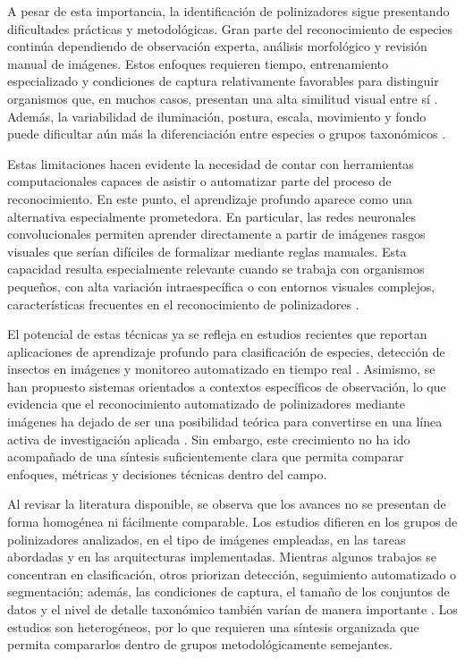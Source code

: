 A pesar de esta importancia, la identificación de polinizadores sigue presentando dificultades prácticas y metodológicas. Gran parte del reconocimiento de especies continúa dependiendo de observación experta, análisis morfológico y revisión manual de imágenes. Estos enfoques requieren tiempo, entrenamiento especializado y condiciones de captura relativamente favorables para distinguir organismos que, en muchos casos, presentan una alta similitud visual entre sí \parencite{spiesman2021bumblebee}. Además, la variabilidad de iluminación, postura, escala, movimiento y fondo puede dificultar aún más la diferenciación entre especies o grupos taxonómicos \parencite{ratnayake2021agriculture}.

Estas limitaciones hacen evidente la necesidad de contar con herramientas computacionales capaces de asistir o automatizar parte del proceso de reconocimiento. En este punto, el aprendizaje profundo aparece como una alternativa especialmente prometedora. En particular, las redes neuronales convolucionales permiten aprender directamente a partir de imágenes rasgos visuales que serían difíciles de formalizar mediante reglas manuales. Esta capacidad resulta especialmente relevante cuando se trabaja con organismos pequeños, con alta variación intraespecífica o con entornos visuales complejos, características frecuentes en el reconocimiento de polinizadores \parencite{hoye2021entomology,borowiec2022deep}.

El potencial de estas técnicas ya se refleja en estudios recientes que reportan aplicaciones de aprendizaje profundo para clasificación de especies, detección de insectos en imágenes y monitoreo automatizado en tiempo real \parencite{bjerge2022tracking,stark2023yolo}. Asimismo, se han propuesto sistemas orientados a contextos específicos de observación, lo que evidencia que el reconocimiento automatizado de polinizadores mediante imágenes ha dejado de ser una posibilidad teórica para convertirse en una línea activa de investigación aplicada \parencite{urbano2025embedded,stark2025pollinators}. Sin embargo, este crecimiento no ha ido acompañado de una síntesis suficientemente clara que permita comparar enfoques, métricas y decisiones técnicas dentro del campo.

Al revisar la literatura disponible, se observa que los avances no se presentan de forma homogénea ni fácilmente comparable. Los estudios difieren en los grupos de polinizadores analizados, en el tipo de imágenes empleadas, en las tareas abordadas y en las arquitecturas implementadas. Mientras algunos trabajos se concentran en clasificación, otros priorizan detección, seguimiento automatizado o segmentación; además, las condiciones de captura, el tamaño de los conjuntos de datos y el nivel de detalle taxonómico también varían de manera importante \parencite{spiesman2021bumblebee,proenca2025leafhoppers}. Los estudios son heterogéneos, por lo que requieren una síntesis organizada que permita compararlos dentro de grupos metodológicamente semejantes.

